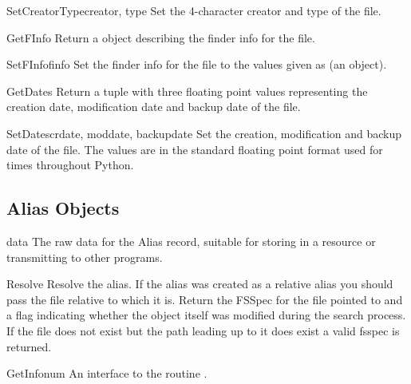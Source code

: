 \begin{methoddesc}[FSSpec]{SetCreatorType}{creator, type}
Set the 4-character creator and type of the file.
\end{methoddesc}

\begin{methoddesc}[FSSpec]{GetFInfo}{}
Return a  object describing the finder info for the file.
\end{methoddesc}

\begin{methoddesc}[FSSpec]{SetFInfo}{finfo}
Set the finder info for the file to the values given as 
(an  object).
\end{methoddesc}

\begin{methoddesc}[FSSpec]{GetDates}{}
Return a tuple with three floating point values representing the
creation date, modification date and backup date of the file.
\end{methoddesc}

\begin{methoddesc}[FSSpec]{SetDates}{crdate, moddate, backupdate}
Set the creation, modification and backup date of the file. The values
are in the standard floating point format used for times throughout
Python.
\end{methoddesc}


\subsection{Alias Objects}
\label{alias-objects}

\begin{memberdesc}[Alias]{data}
The raw data for the Alias record, suitable for storing in a resource
or transmitting to other programs.
\end{memberdesc}

\begin{methoddesc}[Alias]{Resolve}{}
Resolve the alias. If the alias was created as a relative alias you
should pass the file relative to which it is. Return the FSSpec for
the file pointed to and a flag indicating whether the  object
itself was modified during the search process. If the file does
not exist but the path leading up to it does exist a valid fsspec
is returned.
\end{methoddesc}

\begin{methoddesc}[Alias]{GetInfo}{num}
An interface to the \C{} routine .
\end{methoddesc}

